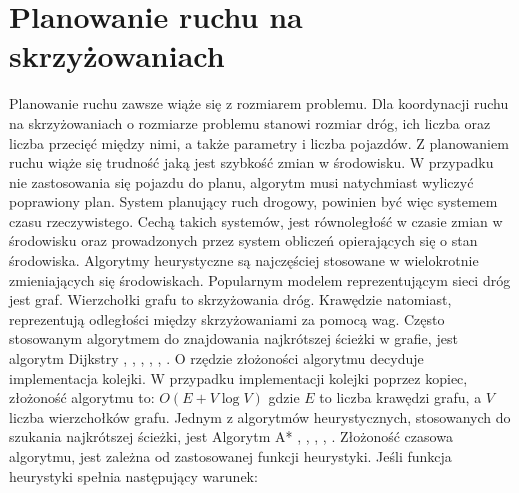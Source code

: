  \label{chap:state-of-the-art}

\section{Planowanie ruchu na skrzyżowaniach}

Planowanie ruchu zawsze wiąże się z rozmiarem problemu. Dla koordynacji ruchu na skrzyżowaniach o rozmiarze problemu stanowi rozmiar dróg, ich liczba oraz liczba przecięć między nimi, a także parametry i liczba pojazdów. Z planowaniem ruchu wiąże się trudność jaką jest szybkość zmian w środowisku. W przypadku nie zastosowania się pojazdu do planu, algorytm musi natychmiast wyliczyć poprawiony plan. System planujący ruch drogowy, powinien być więc systemem czasu rzeczywistego. Cechą takich systemów, jest równoległość w czasie zmian w środowisku oraz prowadzonych przez system obliczeń opierających się o stan środowiska. Algorytmy heurystyczne są najczęściej stosowane w wielokrotnie zmieniających się środowiskach.
\newline
\indent
Popularnym modelem reprezentującym sieci dróg jest graf. Wierzchołki grafu to skrzyżowania dróg. Krawędzie natomiast, reprezentują odległości między skrzyżowaniami za pomocą wag. Często stosowanym algorytmem do znajdowania najkrótszej ścieżki w grafie, jest algorytm Dijkstry \cite{shaikh2013agv}, \cite{ando2003autonomous}, \cite{huang2013improved}, \cite{gazis1997optimal}, \cite{broxmeyer1994vehicle}, \cite{kanoh2007dynamic}. O rzędzie złożoności algorytmu decyduje implementacja kolejki. W przypadku implementacji kolejki poprzez kopiec, złożoność algorytmu to:
\newline
\newline
\begin{math}
O(E + V\log V)
\end{math}
\newline
\newline
gdzie \begin{math}E\end{math} to liczba krawędzi grafu, a \begin{math}V\end{math} liczba wierzchołków grafu.
\indent
\newline
\newline
\indent
  Jednym z algorytmów heurystycznych, stosowanych do szukania najkrótszej ścieżki, jest Algorytm A* \cite{munteanmobile}, \cite{oleiwi2014modified}, \cite{wojnicki2015robust}, \cite{elhalawany2013modified}, \cite{dechter1985generalized}. Złożoność czasowa algorytmu, jest zależna od zastosowanej funkcji heurystyki. Jeśli funkcja heurystyki spełnia następujący warunek:
